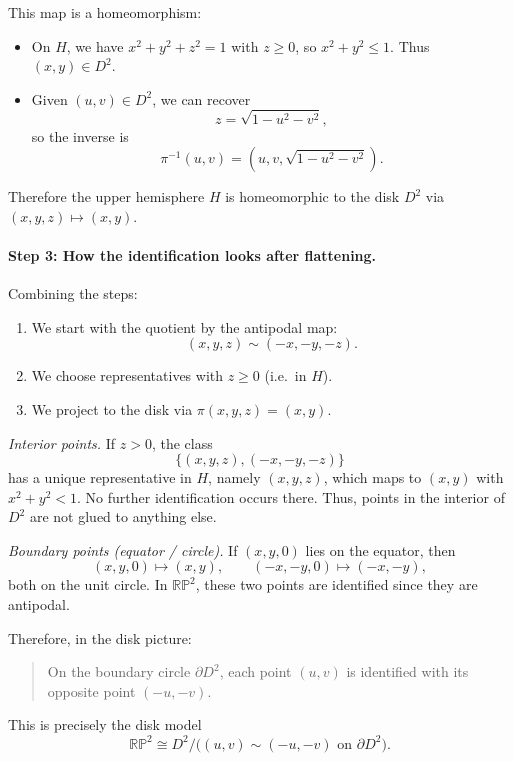 \documentclass[12pt,a4paper]{article}
\theoremstyle{plain}
\theoremstyle{definition}      %
\begin{document}
	This map is a homeomorphism:
	
	\begin{itemize}
		\item On $H$, we have $x^2 + y^2 + z^2 = 1$ with $z \ge 0$, so
		$x^2 + y^2 \le 1$. Thus $(x,y)\in D^2$.
		\item Given $(u,v)\in D^2$, we can recover
		\[
		z = \sqrt{1 - u^2 - v^2},
		\]
		so the inverse is
		\[
		\pi^{-1}(u,v) = (u,v,\sqrt{1-u^2-v^2}).
		\]
	\end{itemize}
	
	Therefore the upper hemisphere $H$ is homeomorphic to the disk $D^2$
	via $(x,y,z)\mapsto(x,y)$.
	
	\paragraph{Step 3: How the identification looks after flattening.}
	
	Combining the steps:
	
	\begin{enumerate}
		\item We start with the quotient by the antipodal map:
		\[
		(x,y,z) \sim (-x,-y,-z).
		\]
		\item We choose representatives with $z\ge 0$ (i.e.\ in $H$).
		\item We project to the disk via $\pi(x,y,z) = (x,y)$.
	\end{enumerate}
	
	\emph{Interior points.}  
	If $z>0$, the class
	\[
	\{(x,y,z),(-x,-y,-z)\}
	\]
	has a unique representative in $H$, namely $(x,y,z)$, which maps to
	$(x,y)$ with $x^2 + y^2 < 1$. No further identification occurs there.
	Thus, points in the interior of $D^2$ are not glued to anything else.
	
	\medskip
	
	\emph{Boundary points (equator / circle).}  
	If $(x,y,0)$ lies on the equator, then
	\[
	(x,y,0) \mapsto (x,y), \qquad (-x,-y,0) \mapsto (-x,-y),
	\]
	both on the unit circle. In $\mathbb{RP}^2$, these two points are
	identified since they are antipodal.
	
	Therefore, in the disk picture:
	
	\begin{quote}
		On the boundary circle $\partial D^2$, each point $(u,v)$ is identified 
		with its opposite point $(-u,-v)$.
	\end{quote}
	
	This is precisely the disk model
	\[
	\mathbb{RP}^2 \cong D^2 / \bigl( (u,v)\sim(-u,-v) \text{ on } \partial D^2 \bigr).
	\]
	
\end{document}
